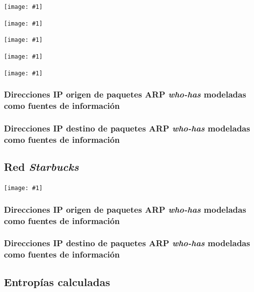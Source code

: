 \documentclass[a4paper, 10pt, twoside]{article}
\newcommand{\grafo}[1]{
  \texttt{[image: \#1]}
}
\begin{document}
\grafo{mcdonalds}

\grafo{mcdonalds-172.17.12.2}

\grafo{mcdonalds-172.17.12.1}

\grafo{mcdonalds-172.17.203.1}

\grafo{mcdonalds-0.0.0.0}


\subsubsection{Direcciones IP origen de paquetes ARP \emph{who-has} modeladas como fuentes de información}




\subsubsection{Direcciones IP destino de paquetes ARP \emph{who-has} modeladas como fuentes de información}




\subsection{Red \emph{Starbucks}}

\grafo{starbucks}


\subsubsection{Direcciones IP origen de paquetes ARP \emph{who-has} modeladas como fuentes de información}




\subsubsection{Direcciones IP destino de paquetes ARP \emph{who-has} modeladas como fuentes de información}



\subsection{Entropías calculadas}


\end{document}
